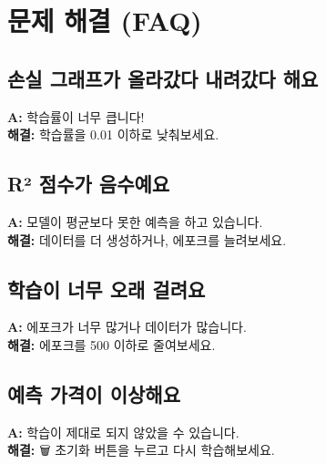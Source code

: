\documentclass[11pt,a4paper]{article}
\begin{document}
\section{문제 해결 (FAQ)}

\subsection{손실 그래프가 올라갔다 내려갔다 해요}

\begin{tcolorbox}[colback=tipBg, colframe=appleRed, title=Q: 손실 그래프가 불안정해요]
\textbf{A:} 학습률이 너무 큽니다!\\[0.2cm]
\textbf{해결:} 학습률을 0.01 이하로 낮춰보세요.
\end{tcolorbox}

\subsection{R² 점수가 음수예요}

\begin{tcolorbox}[colback=tipBg, colframe=appleRed, title=Q: R² 점수가 음수로 나와요]
\textbf{A:} 모델이 평균보다 못한 예측을 하고 있습니다.\\[0.2cm]
\textbf{해결:} 데이터를 더 생성하거나, 에포크를 늘려보세요.
\end{tcolorbox}

\subsection{학습이 너무 오래 걸려요}

\begin{tcolorbox}[colback=tipBg, colframe=appleRed, title=Q: 학습 시간이 너무 길어요]
\textbf{A:} 에포크가 너무 많거나 데이터가 많습니다.\\[0.2cm]
\textbf{해결:} 에포크를 500 이하로 줄여보세요.
\end{tcolorbox}

\subsection{예측 가격이 이상해요}

\begin{tcolorbox}[colback=tipBg, colframe=appleRed, title=Q: 예측 가격이 비정상적이에요]
\textbf{A:} 학습이 제대로 되지 않았을 수 있습니다.\\[0.2cm]
\textbf{해결:} 🗑️ 초기화 버튼을 누르고 다시 학습해보세요.
\end{tcolorbox}
\end{document}
